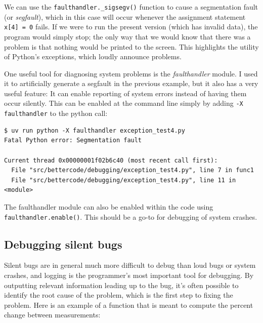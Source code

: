 We can use the \texttt{faulthandler.\_sigsegv()} function to cause a segmentation fault (or \textit{segfault}), which in this case will occur whenever the assignment statement \texttt{x[4] = 0} fails.  If we were to run the present version (which has invalid data), the program would simply stop; the only way that we would know that there was a problem is that nothing would be printed to the screen.  This highlights the utility of Python's exceptions, which loudly announce problems.

One useful tool for diagnosing system problems is the \textit{faulthandler} module. I used it to artificially generate a segfault in the previous example, but it also has a very useful feature: It can enable reporting of system errors instead of having them occur silently.  This can be enabled at the command line simply by adding \texttt{-X faulthandler} to the python call:

\begin{lstlisting}[style=shell]
$ uv run python -X faulthandler exception_test4.py
Fatal Python error: Segmentation fault

Current thread 0x00000001f02b6c40 (most recent call first):
  File "src/bettercode/debugging/exception_test4.py", line 7 in func1
  File "src/bettercode/debugging/exception_test4.py", line 11 in <module>
\end{lstlisting}

The faulthandler module can also be enabled within the code using \texttt{faulthandler.enable()}.  This should be a go-to for debugging of system crashes.

\subsection{Debugging silent bugs}

Silent bugs are in general much more difficult to debug than loud bugs or system crashes, and logging is the programmer's most important tool for debugging. By outputting relevant information leading up to the bug, it's often possible to identify the root cause of the problem, which is the first step to fixing the problem. Here is an example of a function that is meant to compute the percent change between measurements:


